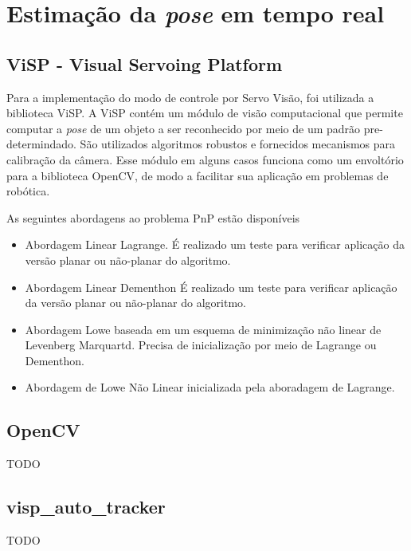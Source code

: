 \chapter{Estimação da \textit{pose} em tempo real}  \label{chap:pose_est}
\section{ViSP - Visual Servoing Platform}

Para a implementação do modo de controle por Servo Visão, foi utilizada a biblioteca ViSP. A ViSP contém um módulo de visão computacional que permite computar a \textit{pose} de um objeto a ser reconhecido por meio de um padrão pre-determindado. São utilizados algoritmos robustos e fornecidos mecanismos para calibração da câmera. Esse módulo em alguns casos funciona como um envoltório para a biblioteca OpenCV, de modo a facilitar sua aplicação em problemas de robótica. 

As seguintes abordagens ao problema PnP estão disponíveis
\begin{itemize}
\item Abordagem Linear Lagrange. É realizado um teste para verificar aplicação da versão planar ou não-planar do algoritmo. 
\item Abordagem Linear Dementhon \citep{dementhon1995model, oberkampf1996iterative}  É realizado um teste para verificar aplicação da versão planar ou não-planar do algoritmo. 
\item Abordagem Lowe baseada em um esquema de minimização não linear de Levenberg Marquartd. Precisa de inicialização por meio de Lagrange ou Dementhon.
\item  Abordagem de Lowe Não Linear inicializada pela aboradagem de Lagrange.
\end{itemize}

\section{OpenCV}
TODO


\section{visp\_auto\_tracker}
TODO